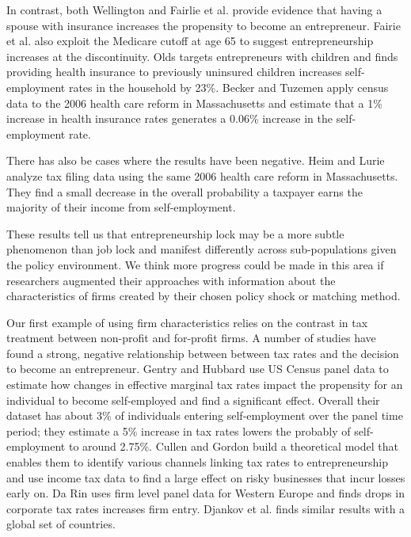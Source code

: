 \documentclass[12pt]{article}
\begin{document}
In contrast, both Wellington \cite{wellington} and Fairlie et al. \cite{fairlie_health} provide evidence that having a spouse with insurance increases the propensity to become an entrepreneur. Fairie et al. \cite{fairlie_health} also exploit the Medicare cutoff at age 65 to suggest entrepreneurship increases at the discontinuity. Olds \cite{olds} targets entrepreneurs with children and finds providing health insurance to previously uninsured children increases self-employment rates in the household by 23\%.  Becker and Tuzemen \cite{tuzemen} apply census data to the 2006 health care reform in Massachusetts and estimate that a 1\% increase in health insurance rates generates a 0.06\% increase in the self-employment rate. 

There has also be cases where the results have been negative. Heim and Lurie \cite{heimLurie} analyze tax filing data using the same 2006 health care reform in Massachusetts. They find a small decrease in the overall probability a taxpayer earns the majority of their income from self-employment.

These results tell us that entrepreneurship lock may be a more subtle phenomenon than job lock and manifest differently across sub-populations given the policy environment. We think more progress could be made in this area if researchers augmented their approaches with information about the characteristics of firms created by their chosen policy shock or matching method. 

Our first example of using firm characteristics relies on the contrast in tax treatment between non-profit and for-profit firms. A number of studies have found a strong, negative relationship between between tax rates and the decision to become an entrepreneur. Gentry and Hubbard \cite{gentry} use US Census panel data to estimate how changes in effective marginal tax rates impact the propensity for an individual to become self-employed and find a significant effect. Overall their dataset has about 3\% of individuals entering self-employment over the panel time period; they estimate a 5\% increase in tax rates lowers the probably of self-employment to around 2.75\%. Cullen and Gordon \cite{cullen} build a theoretical model that enables them to identify various channels linking tax rates to entrepreneurship and use income tax data to find a large effect on risky businesses that incur losses early on. Da Rin \cite{darin} uses firm level panel data for Western Europe and finds drops in corporate tax rates increases firm entry. Djankov et al. \cite{djankov} finds similar results with a global set of countries. 
\end{document}
